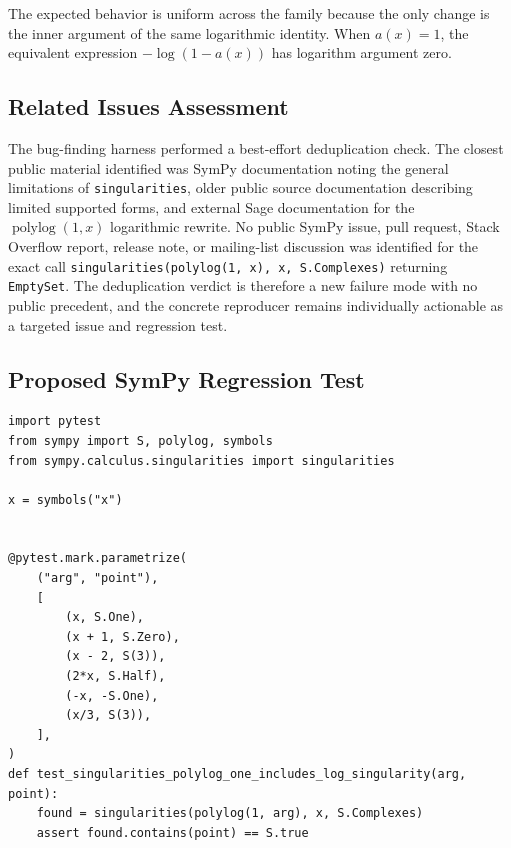 \documentclass[11pt]{article}
\begin{document}
The expected behavior is uniform across the family because the only change is the inner argument of the same logarithmic identity.  When \(a(x)=1\), the equivalent expression \(-\log(1-a(x))\) has logarithm argument zero.

\subsection{Related Issues Assessment}

The bug-finding harness performed a best-effort deduplication check.  The closest public material identified was SymPy documentation noting the general limitations of \texttt{singularities}, older public source documentation describing limited supported forms, and external Sage documentation for the \(\operatorname{polylog}(1,x)\) logarithmic rewrite.  No public SymPy issue, pull request, Stack Overflow report, release note, or mailing-list discussion was identified for the exact call \texttt{singularities(polylog(1, x), x, S.Complexes)} returning \texttt{EmptySet}.  The deduplication verdict is therefore a new failure mode with no public precedent, and the concrete reproducer remains individually actionable as a targeted issue and regression test.

\subsection{Proposed SymPy Regression Test}

\medskip

\begin{lstlisting}[style=bugpython]
import pytest
from sympy import S, polylog, symbols
from sympy.calculus.singularities import singularities

x = symbols("x")


@pytest.mark.parametrize(
    ("arg", "point"),
    [
        (x, S.One),
        (x + 1, S.Zero),
        (x - 2, S(3)),
        (2*x, S.Half),
        (-x, -S.One),
        (x/3, S(3)),
    ],
)
def test_singularities_polylog_one_includes_log_singularity(arg, point):
    found = singularities(polylog(1, arg), x, S.Complexes)
    assert found.contains(point) == S.true
\end{lstlisting}
\end{document}
